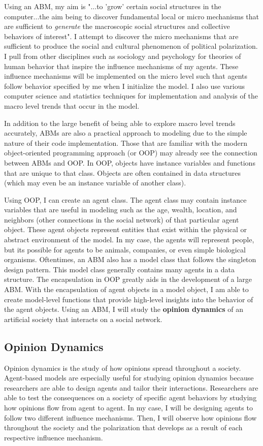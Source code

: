 Using an ABM, my aim is "...to 'grow' certain social structures in the computer...the aim being to discover fundamental local or micro mechanisms that are sufficient to \textit{generate} the macroscopic social structures and collective behaviors of interest"\cite{epstein_growing_1996}. I attempt to discover the micro mechanisms that are sufficient to produce the social and cultural phenomenon of political polarization. I pull from other disciplines such as sociology and psychology for theories of human behavior that inspire the influence mechanisms of my agents. These influence mechanisms will be implemented on the micro level such that agents follow behavior specified by me when I initialize the model. I also use various computer science and statistics techniques for implementation and analysis of the macro level trends that occur in the model.    

In addition to the large benefit of being able to explore macro level trends accurately, ABMs are also a practical approach to modeling due to the simple nature of their code implementation. Those that are familiar with the modern object-oriented programming approach (or OOP) may already see the connection between ABMs and OOP. In OOP, objects have instance variables and functions that are unique to that class. Objects are often contained in data structures (which may even be an instance variable of another class). 

Using OOP, I can create an agent class. The agent class may contain instance variables that are useful in modeling such as the age, wealth, location, and neighbors (other connections in the social network) of that particular agent object. These agent objects represent entities that exist within the physical or abstract environment of the model. In my case, the agents will represent people, but its possible for agents to be animals, companies, or even simple biological organisms. Oftentimes, an ABM also has a model class that follows the singleton design pattern. This model class generally contains many agents in a data structure. The encapsulation in OOP greatly aids in the development of a large ABM. With the encapsulation of agent objects in a model object, I am able to create model-level functions that provide high-level insights into the behavior of the agent objects. Using an ABM, I will study the \textbf{opinion dynamics} of an artificial society that interacts on a social network.


\subsection{Opinion Dynamics}
Opinion dynamics is the study of how opinions spread throughout a society. Agent-based models are especially useful for studying opinion dynamics because researchers are able to design agents and tailor their interactions. Researchers are able to test the consequences on a society of specific agent behaviors by studying how opinions flow from agent to agent. In my case, I will be designing agents to follow two different influence mechanisms. Then, I will observe how opinions flow throughout the society and the polarization that develops as a result of each respective influence mechanism.


